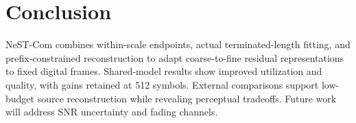 \section{Conclusion}
NeST-Com combines within-scale endpoints, actual terminated-length fitting, and prefix-constrained reconstruction to adapt coarse-to-fine residual representations to fixed digital frames. Shared-model results show improved utilization and quality, with gains retained at 512 symbols. External comparisons support low-budget source reconstruction while revealing perceptual tradeoffs. Future work will address SNR uncertainty and fading channels.
